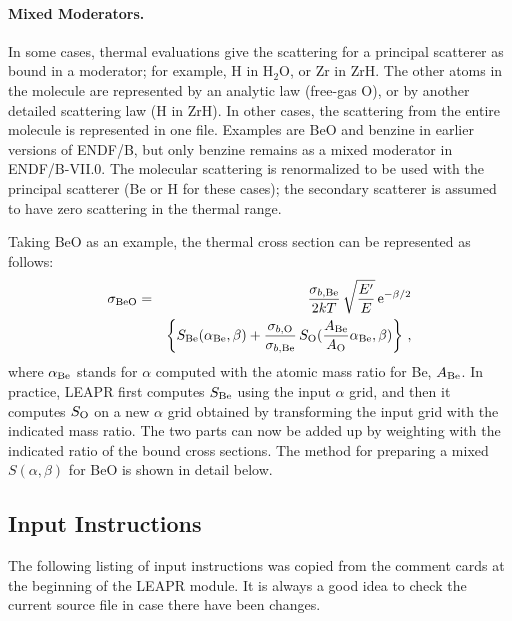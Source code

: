 \paragraph{Mixed Moderators.}
In some cases, thermal evaluations give the scattering for a
principal scatterer as bound in a moderator; for example, H in H$_2$O,
or Zr in ZrH.  The other atoms in the molecule are represented by
an analytic law (free-gas O), or by another detailed scattering law
(H in ZrH).  In other cases, the scattering from the entire molecule
is represented in one file.  Examples are BeO and benzine in
earlier versions of ENDF/B, but only benzine remains as a mixed
moderator in ENDF/B-VII.0.  The molecular scattering is renormalized
to be used with the principal scatterer (Be or H for these cases);
the secondary scatterer is assumed to have zero scattering in the
thermal range.

Taking BeO as an example, the thermal cross section can be
represented as follows:
\begin{eqnarray}
   \sigma_{\rm BeO} &=& \frac{\sigma_{b,{\rm Be}}}{2kT}
     \,\sqrt{\frac{E'}{E}}\,\rm e^{-\beta/2} \nonumber \\
    & & \left\{ S_{\rm Be}(\alpha_{\rm Be},\beta)
       +\frac{\sigma_{b,{\rm O}}}{\sigma_{b,{\rm Be}}}
          \,S_{\rm O}(\frac{A_{\rm Be}}{A_{\rm O}}
             \alpha_{\rm Be},\beta) \right\} \,,
\end{eqnarray}
where $\alpha_{\rm Be}$ stands for $\alpha$ computed with the atomic mass
ratio for Be, $A_{\rm Be}$.  In practice, LEAPR first computes
$S_{\rm Be}$ using the input $\alpha$ grid, and then it computes
$S_{\rm O}$ on a new $\alpha$ grid obtained by transforming the input
grid with the indicated mass ratio.  The two parts can now be added up
by weighting with the indicated ratio of the bound cross sections.  The
method for preparing a mixed $S(\alpha,\beta)$ for BeO is shown in detail
below.


\subsection{Input Instructions}
\label{ssLEAPR_inp}

The following listing of input instructions was copied from the
comment cards at the beginning of the LEAPR module.  It is always
a good idea to check the current source file in case there have
been changes.

